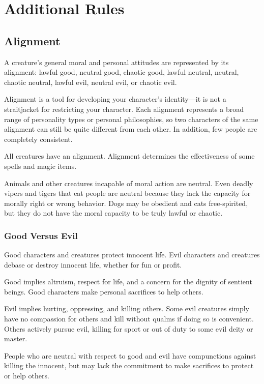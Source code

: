 \chapter{Additional Rules}

\section{Alignment}

\label{f0}				
A creature's general moral and personal attitudes are represented by its alignment: lawful good, neutral good, chaotic good, lawful neutral, neutral, chaotic neutral, lawful evil, neutral evil, or chaotic evil.
				
Alignment is a tool for developing your character's identity---it is not a straitjacket for restricting your character. Each alignment represents a broad range of personality types or personal philosophies, so two characters of the same alignment can still be quite different from each other. In addition, few people are completely consistent.
				
All creatures have an alignment. Alignment determines the effectiveness of some spells and magic items.
				
Animals and other creatures incapable of moral action are neutral. Even deadly vipers and tigers that eat people are neutral because they lack the capacity for morally right or wrong behavior. Dogs may be obedient and cats free-spirited, but they do not have the moral capacity to be truly lawful or chaotic.
				
\subsection{Good Versus Evil}

				
Good characters and creatures protect innocent life. Evil characters and creatures debase or destroy innocent life, whether for fun or profit.
				
Good implies altruism, respect for life, and a concern for the dignity of sentient beings. Good characters make personal sacrifices to help others.
				
Evil implies hurting, oppressing, and killing others. Some evil creatures simply have no compassion for others and kill without qualms if doing so is convenient. Others actively pursue evil, killing for sport or out of duty to some evil deity or master. 
				
People who are neutral with respect to good and evil have compunctions against killing the innocent, but may lack the commitment to make sacrifices to protect or help others. 
				
